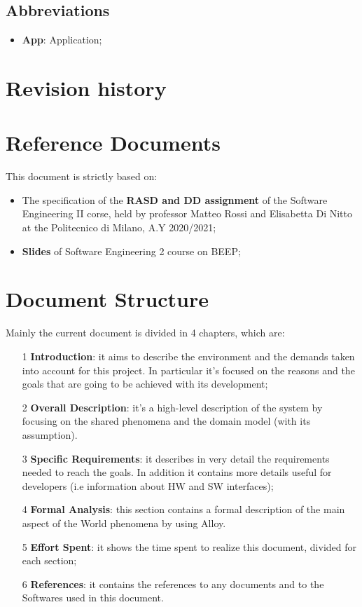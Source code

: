 \subsection{Abbreviations}
\begin{itemize}
\item \textbf{App}: Application;

\end{itemize}



\section{Revision history}

\section{Reference Documents}
This document is strictly based on:
\begin{itemize}
\item The specification of the \textbf{RASD and DD assignment} of the Software Engineering II corse, held by professor Matteo Rossi and Elisabetta Di Nitto at the Politecnico di Milano, A.Y 2020/2021;
\item \textbf{Slides} of Software Engineering 2 course on BEEP;
\end{itemize}
\section{Document Structure}
Mainly the current document is divided in 4 chapters, which are:
\begin{itemize}
\item[1]\textbf{Introduction}: it aims to describe the environment and the demands taken into account for this project. In particular it's focused on the reasons and the goals that are going to be achieved with its development;
\item[2]\textbf{Overall Description}: it's a high-level description of the system by focusing on the shared phenomena and the domain model (with its assumption). 
\item[3]\textbf{Specific Requirements}: it describes in very detail the requirements needed to reach the goals. In addition it contains more details useful for developers (i.e information about HW and SW interfaces);
\item[4]\textbf{Formal Analysis}: this section contains a formal description of the main aspect of the World phenomena by using Alloy. 
\item[5]\textbf{Effort Spent}: it shows the time spent to realize this document, divided for each section;
\item[6]\textbf{References}: it contains the references to any documents and to the Softwares used in this document.
\end{itemize}

